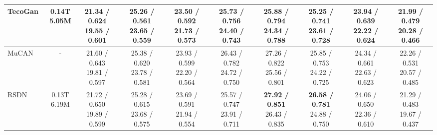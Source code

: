 \begin{table*}[tp]
{\begin{tabular}{l||ccccc||cccc}
 TecoGan~\cite{tecogan2020}& \makecell{0.14T\\5.05M} & \makecell{21.34 / 0.624\\19.55 / 0.601} & \makecell{25.26 / 0.561\\23.65 / 0.559} & \makecell{23.50 / 0.592\\21.73 / 0.573} & \makecell{25.73 / 0.756\\24.40 / 0.743} & \makecell{25.88 / 0.794\\24.34 / 0.788} & \makecell{25.25 / 0.741\\23.61 / 0.728} & \makecell{23.94 / 0.639\\22.22 / 0.624} & \makecell{21.99 / 0.479\\20.28 / 0.466}     \\ \hline
 MuCAN~\cite{mucan}& - & \makecell{21.60 / 0.643\\19.81 / 0.597} & \makecell{25.38 / 0.620\\23.78 / 0.581} & \makecell{23.93 / 0.599\\22.20 / 0.564} & \makecell{26.43 / 0.782\\24.72 / 0.750} & \makecell{27.26 / 0.822\\25.56 / 0.801} & \makecell{25.85 / 0.753\\24.22 / 0.725} & \makecell{24.34 / 0.661\\22.63 / 0.623} & \makecell{22.26 / 0.531\\20.57 / 0.485}  \\ \hline
 RSDN~\cite{rsdn}& \makecell{0.13T\\6.19M} & \makecell{21.72 / 0.650\\19.89 / 0.599} & \makecell{25.28 / 0.615\\23.68 / 0.575} & \makecell{23.69 / 0.591\\21.94 / 0.554} & \makecell{25.57 / 0.747\\23.91 / 0.711} & \makecell{\colorbox{shadecolor}{\bf{27.92 / 0.851}}\\26.43 / 0.835} & \makecell{\colorbox{shadecolor}{\bf{26.58 / 0.781}}\\24.88 / 0.750} & \makecell{24.06 / 0.650\\22.36 / 0.610} & \makecell{21.29 / 0.483\\19.67 / 0.437}   \\ \toprule [0.2em]

\end{tabular}}
\end{table*}
